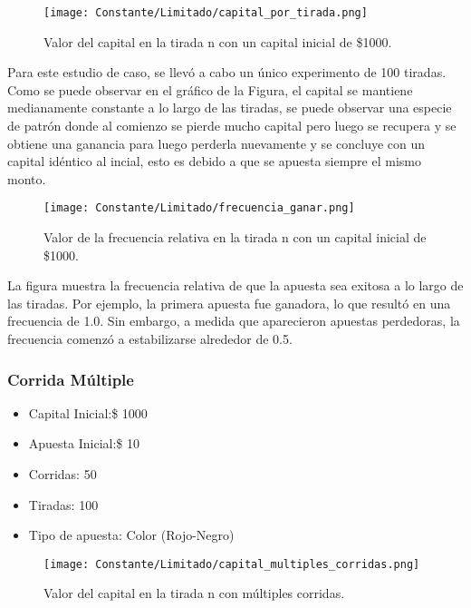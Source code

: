 \documentclass{article}
\begin{document}
    \begin{figure} [h]
        \centering
         \texttt{[image: Constante/Limitado/capital\_por\_tirada.png]}
            \caption{Valor del capital en la tirada n con un capital inicial de \$1000.}
            \label{fig:grafico}
    \end{figure}

Para este estudio de caso, se llevó a cabo un único experimento de 100 tiradas. Como se puede observar en el gráfico de la Figura, el capital se mantiene medianamente constante a lo largo de las tiradas, se puede observar una especie de patrón donde al comienzo se pierde mucho capital pero luego se recupera y se obtiene una ganancia para luego perderla nuevamente y se concluye con un capital idéntico al incial, esto es debido a que se apuesta siempre el mismo monto.

    \begin{figure} [h]
        \centering
         \texttt{[image: Constante/Limitado/frecuencia\_ganar.png]}
            \caption{Valor de la frecuencia relativa en la tirada n con un capital inicial de \$1000.}
            \label{fig:grafico}
    \end{figure}

La figura muestra la frecuencia relativa de que la apuesta sea exitosa a lo largo de las tiradas. Por ejemplo, la primera apuesta fue ganadora, lo que resultó en una frecuencia de 1.0. Sin embargo, a medida que aparecieron apuestas perdedoras, la frecuencia comenzó a estabilizarse alrededor de 0.5.

\subsubsection{Corrida Múltiple}

\begin{itemize}[noitemsep]
\item Capital Inicial:\$ 1000
\item Apuesta Inicial:\$ 10
\item Corridas: 50
\item Tiradas: 100
\item Tipo de apuesta: Color (Rojo-Negro)
\end{itemize}

    \begin{figure} [H]
        \centering
         \texttt{[image: Constante/Limitado/capital\_multiples\_corridas.png]}
            \caption{Valor del capital en la tirada n con múltiples corridas.}
            \label{fig:grafico}
    \end{figure}
\end{document}
